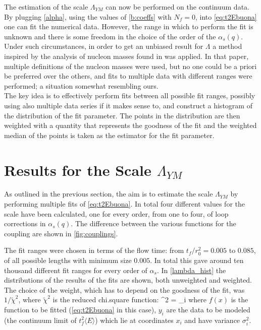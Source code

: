 The estimation of the scale $\Lambda_{YM}$ can now be performed on the continuum data. By plugging \cref{alpha}, using the values of \cref{b:coeffs} with $N_f = 0$, into \cref{eq:t2Ebuona} one can fit the numerical data. However, the range in which to perform the fit is unknown and there is some freedom in the choice of the order of the $\alpha_s(q)$. Under such circumstances, in order to get an unbiased result for  $\Lambda$ a method inspired by the analysis of nucleon masses found in \cite{durr_ab-initio_2008-1}  was applied. In that paper, multiple definitions of the nucleon masses were used, but no one could be a priori be preferred over the others, and fits to multiple data with different ranges were performed; a situation somewhat resembling ours.\\
The key idea is to effectively perform fits between all possible fit ranges, possibly using also multiple data series if it makes sense to, and construct a histogram of the distribution of the fit parameter. The points in the distribution are then weighted with a quantity that represents the goodness of the fit and the weighted median of the points is taken as the estimator for the fit parameter.

\section{Results for the Scale $\Lambda_{YM}$} 
As outlined in the previous section, the aim is to estimate the scale $\Lambda_{YM}$ by performing multiple fits of \cref{eq:t2Ebuona}. In total four different values for the scale have been calculated, one for every order, from one to four, of loop corrections in $\alpha_s(q)$. The difference between the various functions for the coupling are shown in \cref{fig:couplings}. 


The fit ranges were chosen in terms of the flow time: from $t_f/r_0^2 = 0.005$ to $0.085$, of all possible lengths with minimum size $0.005$. In total this gave around ten thousand different fit ranges for every order of $\alpha_s$. In \cref{lambda_hist} the distributions of the results of the fits are shown, both unweighted and weighted. The choice of the weight, which has to depend on the goodness of the fit, was $1/\tilde\chi^2$, where $\tilde\chi^2$ is the reduced chi.square function:
\beq
\tilde\chi^2 =  \sum_i
\eeq
where $f(x)$ is the function to be fitted (\cref{eq:t2Ebuona} in this case), $y_i$ are the data to be modeled (the continuum limit of $t_f^2\langle E\rangle$) which lie at coordinates $x_i$ and have variance $\sigma_i^2$. 

